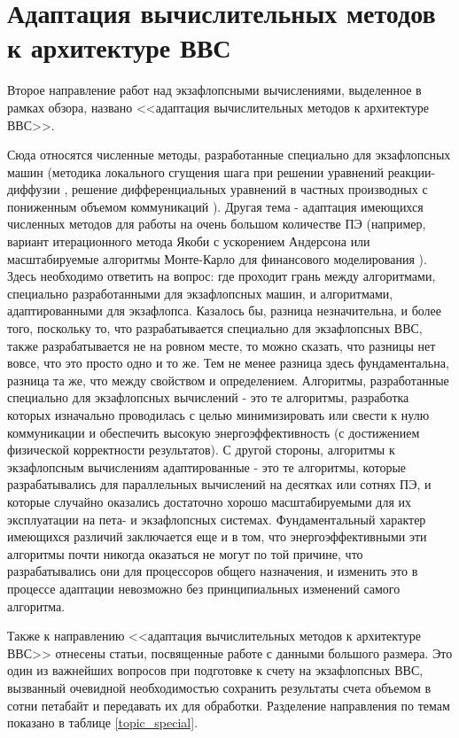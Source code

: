  \clearpage

\section{Адаптация вычислительных методов к архитектуре ВВС}

Второе направление работ над экзафлопсными вычислениями, выделенное в рамках обзора, названо <<адаптация вычислительных методов к архитектуре ВВС>>. 

Сюда относятся численные методы, разработанные специально для экзафлопсных машин (методика локального сгущения шага при решении уравнений реакции-диффузии \cite{Krause2016164}, решение дифференциальных уравнений в частных производных с пониженным объемом коммуникаций \cite{Norman2015}).
Другая тема  - адаптация имеющихся численных методов для работы на очень большом количестве ПЭ (например, вариант итерационного метода Якоби с ускорением Андерсона \cite{Pratapa201643} или масштабируемые алгоритмы Монте-Карло для финансового моделирования \cite{Alexandrov20111708}). Здесь необходимо ответить на вопрос: где проходит грань между алгоритмами, специально разработанными для экзафлопсных машин, и алгоритмами, адаптированными для экзафлопса. Казалось бы, разница незначительна, и более того, поскольку то, что разрабатывается специально для экзафлопсных ВВС, также разрабатывается не на ровном месте, то можно сказать, что разницы нет вовсе, что это просто одно и то же. Тем не менее  разница здесь фундаментальна, разница та же, что между свойством и определением. Алгоритмы, разработанные специально для экзафлопсных вычислений - это те алгоритмы, разработка которых изначально проводилась с целью минимизировать или свести к нулю коммуникации и обеспечить высокую энергоэффективность  (с достижением физической корректности результатов). С другой стороны, алгоритмы к экзафлопсным вычислениям адаптированные -  это те алгоритмы, которые разрабатывались для параллельных вычислений на десятках или сотнях ПЭ, и которые случайно оказались достаточно хорошо масштабируемыми для их эксплуатации на пета- и экзафлопсных системах. Фундаментальный характер имеющихся различий заключается еще и в том, 
что энергоэффективными эти алгоритмы почти никогда оказаться не могут по той причине, что разрабатывались они для процессоров общего назначения, и изменить это в процессе адаптации невозможно без принципиальных изменений самого алгоритма.

Также к направлению <<адаптация вычислительных методов к архитектуре ВВС>> отнесены статьи, посвященные работе с данными большого размера. Это один из важнейших вопросов при подготовке к счету на экзафлопсных ВВС, вызванный очевидной необходимостью сохранить результаты счета объемом в сотни петабайт \cite{Abramson20141} и передавать их для обработки. Разделение направления по темам показано в таблице \ref{topic_special}.	


